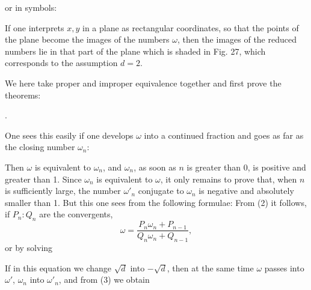 


or in symbols:


If one interprets $x, y$ in a plane as rectangular coordinates, so
that the points of the plane become the images of the numbers $\omega$, then
the images of the reduced numbers lie in that part of the plane which is
shaded in Fig. 27, which corresponds to the assumption $d = 2$.


We here take proper and improper equivalence together
and first prove the theorems:

.\quad {}

One sees this easily if one develops $\omega$ into a continued fraction
and goes as far as the closing number $\omega_n$:


Then $\omega$ is equivalent to $\omega_n$, and $\omega_n$, as soon as $n$ is greater than 0,
is positive and greater than 1. Since $\omega_n$ is equivalent to $\omega$, it only
remains to prove that, when $n$ is sufficiently large,
the number $\omega'_n$ conjugate to $\omega_n$ is negative and absolutely smaller than 1.
But this one sees from the following formulae: From (2) it follows, if
$P_n : Q_n$ are the convergents,
\[
\omega = \dfrac{P_n \omega_n + P_{n-1}}{Q_n \omega_n + Q_{n-1}},
\]
or by solving


If in this equation we change $\sqrt{d}$ into $-\sqrt{d}$, then at the same time
$\omega$ passes into $\omega'$, $\omega_n$ into $\omega'_n$, and from (3) we obtain


